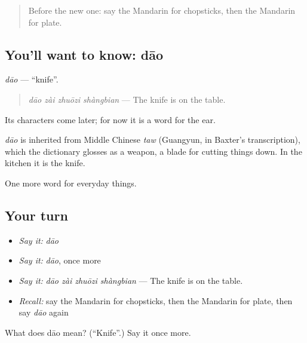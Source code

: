 \label{lesson:ZH-C101-dao}



\begin{quote}
Before the new one: say the Mandarin for chopsticks, then the Mandarin for plate.
\end{quote}

\subsection*{You'll want to know: dāo}
\emph{dāo} — \textquotedblleft{}knife\textquotedblright{}.

\begin{quote}
\emph{dāo zài zhuōzi shàngbian} — The knife is on the table.
\end{quote}

Its characters come later; for now it is a word for the ear.

\begin{cousinweb}
\emph{dāo} is inherited from Middle Chinese \emph{taw} (Guangyun, in Baxter's transcription), which the dictionary glosses as a weapon, a blade for cutting things down. In the kitchen it is the knife.
\end{cousinweb}

\begin{grammarlens}[title={What you've built}]
One more word for everyday things.
\end{grammarlens}

\subsection*{Your turn}
\begin{itemize}
\raggedright
  \item \emph{Say it:} \emph{dāo}
  \item \emph{Say it:} \emph{dāo}, once more
  \item \emph{Say it:} \emph{dāo zài zhuōzi shàngbian} — The knife is on the table.
  \item \emph{Recall:} say the Mandarin for chopsticks, then the Mandarin for plate, then say \emph{dāo} again
\end{itemize}

\begin{tcolorbox}[breakable,colback=teal!4,colframe=teal!35!black,title={Before you move on}]
What does dāo mean? (\textquotedblleft{}Knife\textquotedblright{}.) Say it once more.
\end{tcolorbox}
